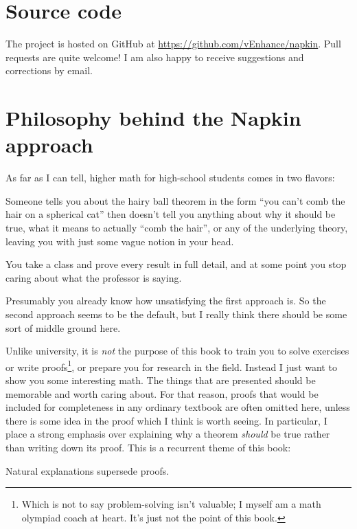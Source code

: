 \section*{Source code}
The project is hosted on GitHub at
\url{https://github.com/vEnhance/napkin}.
Pull requests are quite welcome!
I am also happy to receive suggestions and corrections by email.

\section*{Philosophy behind the Napkin approach}
As far as I can tell, higher math for high-school students
comes in two flavors:
\begin{itemize}
	\ii Someone tells you about the hairy ball theorem in the form
	``you can't comb the hair on a spherical cat''
	then doesn't tell you anything about why it should be true,
	what it means to actually ``comb the hair'',
	or any of the underlying theory,
	leaving you with just some vague notion in your head.

	\ii You take a class and prove every result in full detail,
	and at some point you stop caring about what the professor is saying.
\end{itemize}
Presumably you already know how unsatisfying the first approach is.
So the second approach seems to be the default,
but I really think there should be some sort of middle ground here.


Unlike university, it is \emph{not} the purpose of this book to
train you to solve exercises or write proofs\footnote{Which is
	not to say problem-solving isn't valuable;
	I myself am a math olympiad coach at heart.
	It's just not the point of this book.},
or prepare you for research in the field.
Instead I just want to show you some interesting math.
The things that are presented should be memorable and worth caring about.
For that reason, proofs that would be included for completeness
in any ordinary textbook are often omitted here,
unless there is some idea in the proof which I think is worth seeing.
In particular, I place a strong emphasis over explaining
why a theorem \emph{should} be true rather than writing down its proof.
This is a recurrent theme of this book:
\begin{moral}
	Natural explanations supersede proofs.
\end{moral}

